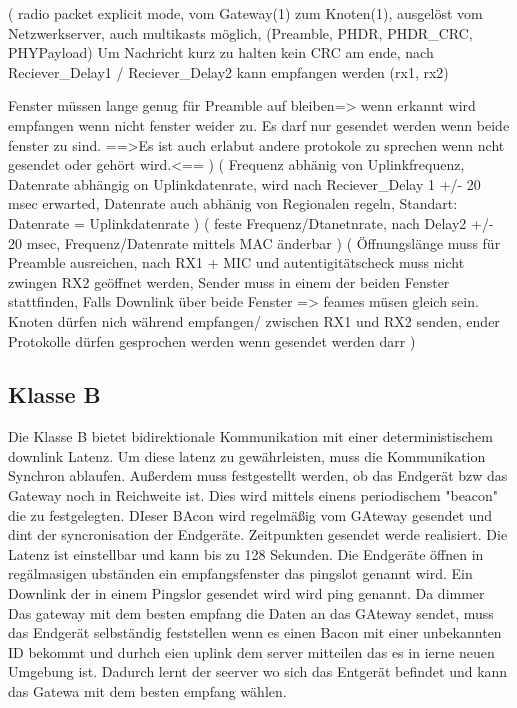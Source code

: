 \documentclass[a4paper,12pt]{article}
\begin{document}
            \cite{LoRaSpec}(
                radio packet explicit mode, vom Gateway(1) zum Knoten(1), ausgelöst vom Netzwerkserver, auch multikasts möglich, (Preamble, PHDR, PHDR\_CRC, PHYPayload)
            Um Nachricht kurz zu halten kein CRC am ende, nach Reciever\_Delay1 / Reciever\_Delay2 kann empfangen werden (rx1, rx2) 
            
            Fenster müssen lange genug für Preamble auf bleiben=> wenn erkannt wird empfangen wenn nicht fenster weider zu. Es darf nur gesendet werden wenn beide fenster zu sind.
            ==>Es ist auch erlabut andere protokole zu sprechen wenn ncht gesendet oder gehört wird.<==
            )
            \cite{LoRaSpec}(
                Frequenz abhänig von Uplinkfrequenz, Datenrate abhängig on Uplinkdatenrate, wird nach Reciever\_Delay 1 +/- 20 msec erwarted, Datenrate auch abhänig von Regionalen regeln, Standart: Datenrate = Uplinkdatenrate
            )
            \cite{LoRaSpec}(
                feste Frequenz/Dtanetnrate, nach Delay2 +/- 20 msec, Frequenz/Datenrate mittels MAC änderbar
            )
            \cite{LoRaSpec}(
                Öffnungslänge muss für Preamble ausreichen, nach RX1 + MIC und autentigitätscheck muss nicht zwingen RX2 geöffnet werden, Sender muss in einem der beiden Fenster stattfinden, Falls Downlink über beide Fenster => feames müsen gleich sein. Knoten dürfen nich während empfangen/ zwischen RX1 und RX2 senden, ender Protokolle dürfen gesprochen werden wenn gesendet werden darr
            )
        \subsection{Klasse B}
            Die Klasse B bietet bidirektionale Kommunikation mit einer deterministischem downlink Latenz. Um diese latenz zu gewährleisten, muss die Kommunikation Synchron ablaufen. Außerdem muss festgestellt werden, ob das Endgerät bzw das Gateway noch in Reichweite ist. Dies wird mittels einens periodischem "beacon" die zu festgelegten.
            DIeser BAcon wird regelmäßig vom GAteway gesendet und dint der syncronisation der Endgeräte.
            Zeitpunkten gesendet werde realisiert. Die Latenz ist einstellbar und kann bis zu 128 Sekunden.
            Die Endgeräte öffnen in regälmasigen ubständen ein empfangsfenster das pingslot genannt wird. Ein Downlink der in einem Pingslor gesendet wird wird ping genannt. Da dimmer Das gateway mit dem besten empfang die Daten an das GAteway sendet, muss das Endgerät selbständig feststellen wenn es einen Bacon mit einer unbekannten ID bekommt und durhch eien uplink dem server mitteilen das es in ierne neuen Umgebung ist. Dadurch lernt der seerver
            wo sich das Entgerät befindet und kann das Gatewa mit dem besten empfang wählen.
\end{document}
